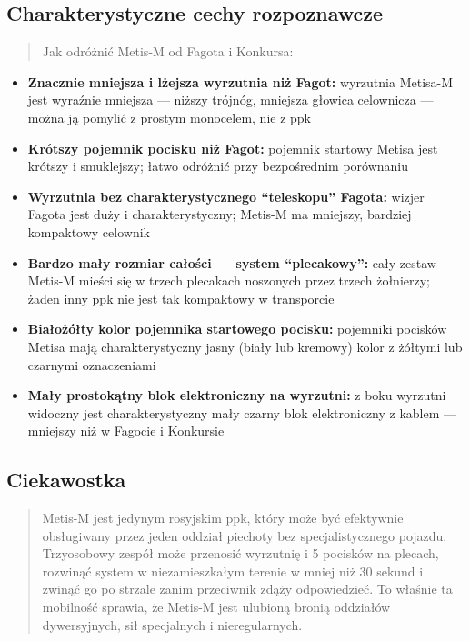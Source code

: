 \documentclass[12pt,oneside]{book}
\providecommand{\tightlist}{%
  \setlength{\itemsep}{0pt}\setlength{\parskip}{0pt}}
\begin{document}
\subsection{Charakterystyczne cechy
rozpoznawcze}\label{charakterystyczne-cechy-rozpoznawcze-52}

\begin{quote}
Jak odróżnić Metis-M od Fagota i Konkursa:
\end{quote}

\begin{itemize}
\tightlist
\item
  \textbf{Znacznie mniejsza i lżejsza wyrzutnia niż Fagot:} wyrzutnia
  Metisa-M jest wyraźnie mniejsza --- niższy trójnóg, mniejsza głowica
  celownicza --- można ją pomylić z prostym monocelem, nie z ppk
\item
  \textbf{Krótszy pojemnik pocisku niż Fagot:} pojemnik startowy Metisa
  jest krótszy i smuklejszy; łatwo odróżnić przy bezpośrednim porównaniu
\item
  \textbf{Wyrzutnia bez charakterystycznego ``teleskopu'' Fagota:}
  wizjer Fagota jest duży i charakterystyczny; Metis-M ma mniejszy,
  bardziej kompaktowy celownik
\item
  \textbf{Bardzo mały rozmiar całości --- system ``plecakowy'':} cały
  zestaw Metis-M mieści się w trzech plecakach noszonych przez trzech
  żołnierzy; żaden inny ppk nie jest tak kompaktowy w transporcie
\item
  \textbf{Białożółty kolor pojemnika startowego pocisku:} pojemniki
  pocisków Metisa mają charakterystyczny jasny (biały lub kremowy) kolor
  z żółtymi lub czarnymi oznaczeniami
\item
  \textbf{Mały prostokątny blok elektroniczny na wyrzutni:} z boku
  wyrzutni widoczny jest charakterystyczny mały czarny blok
  elektroniczny z kablem --- mniejszy niż w Fagocie i Konkursie
\end{itemize}

\subsection{Ciekawostka}\label{ciekawostka-52}

\begin{quote}
Metis-M jest jedynym rosyjskim ppk, który może być efektywnie
obsługiwany przez jeden oddział piechoty bez specjalistycznego pojazdu.
Trzyosobowy zespół może przenosić wyrzutnię i 5 pocisków na plecach,
rozwinąć system w niezamieszkałym terenie w mniej niż 30 sekund i zwinąć
go po strzale zanim przeciwnik zdąży odpowiedzieć. To właśnie ta
mobilność sprawia, że Metis-M jest ulubioną bronią oddziałów
dywersyjnych, sił specjalnych i nieregularnych.
\end{quote}
\end{document}
